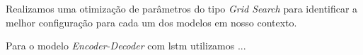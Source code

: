 

Realizamos uma otimização de parâmetros do tipo \textit{Grid Search} para identificar a melhor configuração para cada um dos modelos em nosso contexto. 

Para o modelo \textit{Encoder-Decoder} com \acrshort{lstm} utilizamos ...




